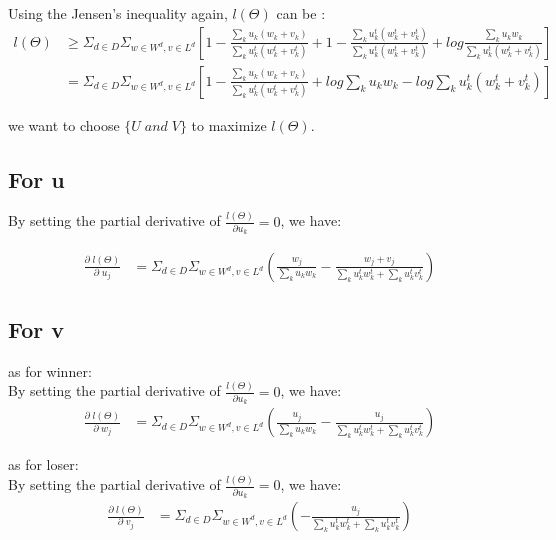 \documentclass{article}
\begin{document}
Using the Jensen's inequality again, $l(\Theta)$ can be :
\begin{align}
l(\Theta)
& \geq \Sigma_{d \in D} \Sigma_{w\in W^d, v\in L^d} [1- \frac{\sum_k u_k(w_k+v_k)}{\sum_k u_k^t(w_k^t +v_k^t)}+ 1-\frac{\sum_k u_k^t(w_k^t +v_k^t)}{\sum_k u_k^t(w_k^t +v_k^t)} +log \frac{\sum_k u_k w_k}{\sum_k u_k^t (w_k^t+v_k^t)}]\\
& =\Sigma_{d \in D} \Sigma_{w\in W^d, v\in L^d} [1- \frac{\sum_k u_k(w_k+v_k)}{\sum_k u_k^t(w_k^t +v_k^t)}+ log \sum_k u_k w_k -log \sum_k u_k^t (w_k^t+v_k^t)]
\end{align}

 we want to choose $\{ U \; and \; V\}$ to maximize $ l(\Theta). $ 


\subsection{For u}
By setting the partial derivative of $\frac{l(\Theta)}{\partial u_k}=0$, we have:

\begin{align}
\frac{\partial \;l(\Theta) }{\partial \;u_j}
 &= \Sigma_{d \in D} \Sigma_{w\in W^d, v\in L^d}(\frac{w_j}{\sum_k u_k w_k}-\frac{w_j+v_j}{\sum_k u_k^t w_k^t + \sum_k u_k^t v_k^t})
\end{align}

\subsection{For v}

as for winner:\\
By setting the partial derivative of $\frac{l(\Theta)}{\partial u_k}=0$, we have:
\begin{align}
\frac{\partial \;l(\Theta)}{\partial \;w_j}
&=  \Sigma_{d \in D} \Sigma_{w\in W^d, v\in L^d}(\frac{u_j}{\sum_k u_k w_k}-\frac{u_j}{\sum_k u_k^t w_k^t + \sum_k u_k^t v_k^t})
\end{align}

as for loser:\\
By setting the partial derivative of $\frac{l(\Theta)}{\partial u_k}=0$, we have:
\begin{align}
\frac{\partial \;l(\Theta)}{\partial \;v_j}
&=  \Sigma_{d \in D} \Sigma_{w\in W^d, v\in L^d}(-\frac{u_j}{\sum_k u_k^t w_k^t + \sum_k u_k^t v_k^t})
\end{align}
\end{document}
